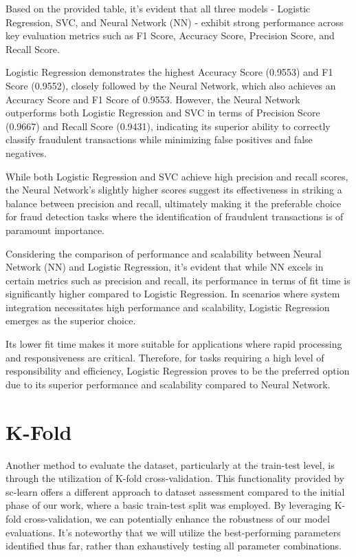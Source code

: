 \documentclass[conference]{IEEEtran}
\begin{document}
Based on the provided table, it's evident that all three models - Logistic Regression, SVC, and Neural Network (NN) - exhibit strong performance across key evaluation metrics such as F1 Score, Accuracy Score, Precision Score, and Recall Score. 

Logistic Regression demonstrates the highest Accuracy Score (0.9553) and F1 Score (0.9552), closely followed by the Neural Network, which also achieves an Accuracy Score and F1 Score of 0.9553. However, the Neural Network outperforms both Logistic Regression and SVC in terms of Precision Score (0.9667) and Recall Score (0.9431), indicating its superior ability to correctly classify fraudulent transactions while minimizing false positives and false negatives.

While both Logistic Regression and SVC achieve high precision and recall scores, the Neural Network's slightly higher scores suggest its effectiveness in striking a balance between precision and recall, ultimately making it the preferable choice for fraud detection tasks where the identification of fraudulent transactions is of paramount importance.

Considering the comparison of performance and scalability between Neural Network (NN) and Logistic Regression, it's evident that while NN excels in certain metrics such as precision and recall, its performance in terms of fit time is significantly higher compared to Logistic Regression. In scenarios where system integration necessitates high performance and scalability, Logistic Regression emerges as the superior choice.

Its lower fit time makes it more suitable for applications where rapid processing and responsiveness are critical. Therefore, for tasks requiring a high level of responsibility and efficiency, Logistic Regression proves to be the preferred option due to its superior performance and scalability compared to Neural Network.

\section{K-Fold}

Another method to evaluate the dataset, particularly at the train-test level, is through the utilization of K-fold cross-validation. This functionality provided by sc-learn offers a different approach to dataset assessment compared to the initial phase of our work, where a basic train-test split was employed. By leveraging K-fold cross-validation, we can potentially enhance the robustness of our model evaluations. It's noteworthy that we will utilize the best-performing parameters identified thus far, rather than exhaustively testing all parameter combinations.
\end{document}
